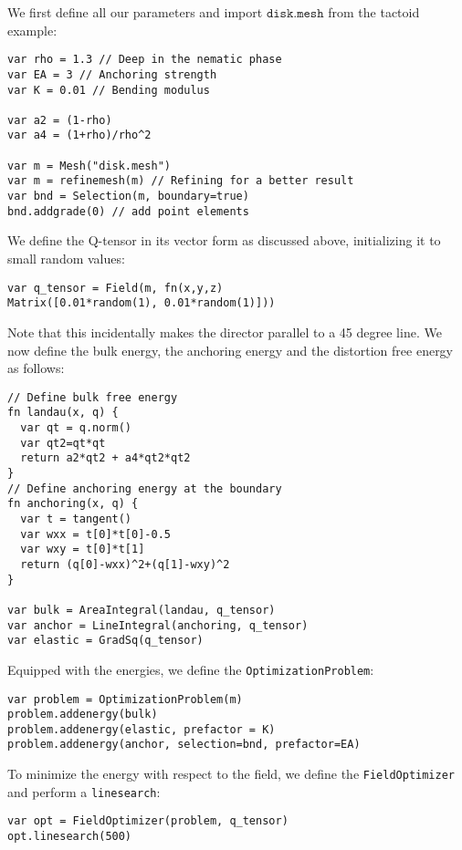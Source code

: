 \documentclass{article}
\begin{document}
We first define all our parameters and import $\texttt{disk.mesh}$ from the tactoid example:
\begin{lstlisting}
var rho = 1.3 // Deep in the nematic phase
var EA = 3 // Anchoring strength
var K = 0.01 // Bending modulus

var a2 = (1-rho)
var a4 = (1+rho)/rho^2

var m = Mesh("disk.mesh")
var m = refinemesh(m) // Refining for a better result
var bnd = Selection(m, boundary=true)
bnd.addgrade(0) // add point elements

\end{lstlisting}
We define the Q-tensor in its vector form as discussed above, initializing it to small random values:
\begin{lstlisting}
var q_tensor = Field(m, fn(x,y,z)
Matrix([0.01*random(1), 0.01*random(1)]))
\end{lstlisting}
Note that this incidentally makes the director parallel to a 45 degree line. 
We now define the bulk energy, the anchoring energy and the distortion free energy as follows:
\begin{lstlisting}
// Define bulk free energy
fn landau(x, q) {
  var qt = q.norm()
  var qt2=qt*qt
  return a2*qt2 + a4*qt2*qt2
}
// Define anchoring energy at the boundary
fn anchoring(x, q) {
  var t = tangent()
  var wxx = t[0]*t[0]-0.5
  var wxy = t[0]*t[1]
  return (q[0]-wxx)^2+(q[1]-wxy)^2
}

var bulk = AreaIntegral(landau, q_tensor)
var anchor = LineIntegral(anchoring, q_tensor)
var elastic = GradSq(q_tensor)
\end{lstlisting}
Equipped with the energies, we define the \texttt{OptimizationProblem}:
\begin{lstlisting}
var problem = OptimizationProblem(m)
problem.addenergy(bulk)
problem.addenergy(elastic, prefactor = K)
problem.addenergy(anchor, selection=bnd, prefactor=EA)
\end{lstlisting}
To minimize the energy with respect to the field, we define the \texttt{FieldOptimizer} and perform a \texttt{linesearch}:
\begin{lstlisting}
var opt = FieldOptimizer(problem, q_tensor)
opt.linesearch(500)
\end{lstlisting}
\end{document}
